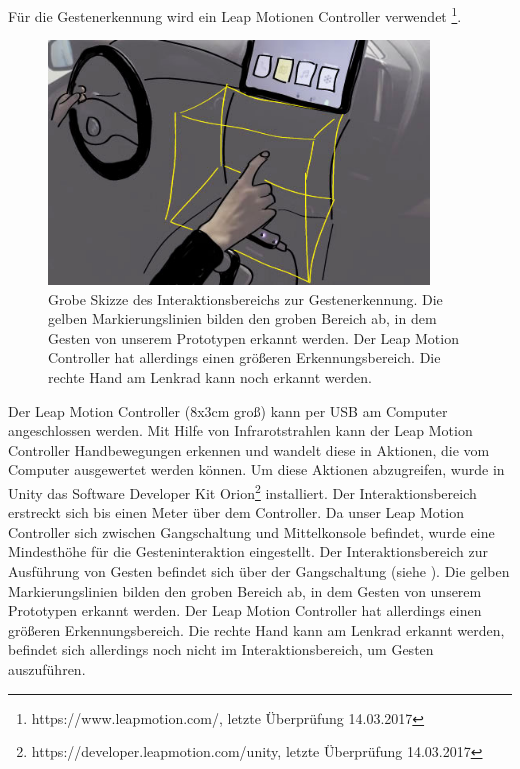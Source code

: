 Für die Gestenerkennung wird ein Leap Motionen Controller verwendet \footnote{https://www.leapmotion.com/, letzte Überprüfung 14.03.2017}. 
\begin{figure}[ht]
  \centering
  \includegraphics[width=0.9\textwidth]{img/GestenbereichSkizze2.jpg}
  \caption[Grobe Skizze des Interaktionsbereichs zur Gestenerkennung]{Grobe Skizze des Interaktionsbereichs zur Gestenerkennung. Die gelben Markierungslinien bilden den groben Bereich ab, in dem Gesten von unserem Prototypen erkannt werden. Der Leap Motion Controller hat allerdings einen größeren Erkennungsbereich. Die rechte Hand am Lenkrad kann noch erkannt werden.}
  \label{fig:Interaktionsbereich_Leap}
\end{figure} 
Der Leap Motion Controller (8x3cm groß) kann per USB am Computer angeschlossen werden. 
Mit Hilfe von Infrarotstrahlen kann der Leap Motion Controller Handbewegungen erkennen und wandelt diese in Aktionen, die vom Computer ausgewertet werden können. 
Um diese Aktionen abzugreifen, wurde in Unity das Software Developer Kit Orion\footnote{https://developer.leapmotion.com/unity, letzte Überprüfung 14.03.2017} installiert.
Der Interaktionsbereich erstreckt sich bis einen Meter über dem Controller. 
Da unser Leap Motion Controller sich zwischen Gangschaltung und Mittelkonsole befindet, wurde eine Mindesthöhe für die Gesteninteraktion eingestellt. 
Der Interaktionsbereich zur Ausführung von Gesten befindet sich über der Gangschaltung (siehe ). Die gelben Markierungslinien bilden den groben Bereich ab, in dem Gesten von unserem Prototypen erkannt werden. Der Leap Motion Controller hat allerdings einen größeren Erkennungsbereich. Die rechte Hand kann am Lenkrad erkannt werden, befindet sich allerdings noch nicht im Interaktionsbereich, um Gesten auszuführen.
 
